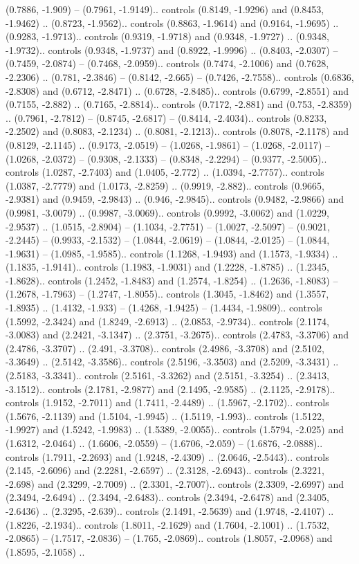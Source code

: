 {(0.7886, -1.909) -- (0.7961, -1.9149).. controls (0.8149, -1.9296) and (0.8453, -1.9462) .. (0.8723, -1.9562).. controls (0.8863, -1.9614) and (0.9164, -1.9695) .. (0.9283, -1.9713).. controls (0.9319, -1.9718) and (0.9348, -1.9727) .. (0.9348, -1.9732).. controls (0.9348, -1.9737) and (0.8922, -1.9996) .. (0.8403, -2.0307) -- (0.7459, -2.0874) -- (0.7468, -2.0959).. controls (0.7474, -2.1006) and (0.7628, -2.2306) .. (0.781, -2.3846) -- (0.8142, -2.665) -- (0.7426, -2.7558).. controls (0.6836, -2.8308) and (0.6712, -2.8471) .. (0.6728, -2.8485).. controls (0.6799, -2.8551) and (0.7155, -2.882) .. (0.7165, -2.8814).. controls (0.7172, -2.881) and (0.753, -2.8359) .. (0.7961, -2.7812) -- (0.8745, -2.6817) -- (0.8414, -2.4034).. controls (0.8233, -2.2502) and (0.8083, -2.1234) .. (0.8081, -2.1213).. controls (0.8078, -2.1178) and (0.8129, -2.1145) .. (0.9173, -2.0519) -- (1.0268, -1.9861) -- (1.0268, -2.0117) -- (1.0268, -2.0372) -- (0.9308, -2.1333) -- (0.8348, -2.2294) -- (0.9377, -2.5005).. controls (1.0287, -2.7403) and (1.0405, -2.772) .. (1.0394, -2.7757).. controls (1.0387, -2.7779) and (1.0173, -2.8259) .. (0.9919, -2.882).. controls (0.9665, -2.9381) and (0.9459, -2.9843) .. (0.946, -2.9845).. controls (0.9482, -2.9866) and (0.9981, -3.0079) .. (0.9987, -3.0069).. controls (0.9992, -3.0062) and (1.0229, -2.9537) .. (1.0515, -2.8904) -- (1.1034, -2.7751) -- (1.0027, -2.5097) -- (0.9021, -2.2445) -- (0.9933, -2.1532) -- (1.0844, -2.0619) -- (1.0844, -2.0125) -- (1.0844, -1.9631) -- (1.0985, -1.9585).. controls (1.1268, -1.9493) and (1.1573, -1.9334) .. (1.1835, -1.9141).. controls (1.1983, -1.9031) and (1.2228, -1.8785) .. (1.2345, -1.8628).. controls (1.2452, -1.8483) and (1.2574, -1.8254) .. (1.2636, -1.8083) -- (1.2678, -1.7963) -- (1.2747, -1.8055).. controls (1.3045, -1.8462) and (1.3557, -1.8935) .. (1.4132, -1.933) -- (1.4268, -1.9425) -- (1.4434, -1.9809).. controls (1.5992, -2.3424) and (1.8249, -2.6913) .. (2.0853, -2.9734).. controls (2.1174, -3.0083) and (2.2421, -3.1347) .. (2.3751, -3.2675).. controls (2.4783, -3.3706) and (2.4786, -3.3707) .. (2.491, -3.3708).. controls (2.4986, -3.3708) and (2.5102, -3.3649) .. (2.5142, -3.3586).. controls (2.5196, -3.3503) and (2.5209, -3.3431) .. (2.5183, -3.3341).. controls (2.5161, -3.3262) and (2.5151, -3.3254) .. (2.3413, -3.1512).. controls (2.1781, -2.9877) and (2.1495, -2.9585) .. (2.1125, -2.9178).. controls (1.9152, -2.7011) and (1.7411, -2.4489) .. (1.5967, -2.1702).. controls (1.5676, -2.1139) and (1.5104, -1.9945) .. (1.5119, -1.993).. controls (1.5122, -1.9927) and (1.5242, -1.9983) .. (1.5389, -2.0055).. controls (1.5794, -2.025) and (1.6312, -2.0464) .. (1.6606, -2.0559) -- (1.6706, -2.059) -- (1.6876, -2.0888).. controls (1.7911, -2.2693) and (1.9248, -2.4309) .. (2.0646, -2.5443).. controls (2.145, -2.6096) and (2.2281, -2.6597) .. (2.3128, -2.6943).. controls (2.3221, -2.698) and (2.3299, -2.7009) .. (2.3301, -2.7007).. controls (2.3309, -2.6997) and (2.3494, -2.6494) .. (2.3494, -2.6483).. controls (2.3494, -2.6478) and (2.3405, -2.6436) .. (2.3295, -2.639).. controls (2.1491, -2.5639) and (1.9748, -2.4107) .. (1.8226, -2.1934).. controls (1.8011, -2.1629) and (1.7604, -2.1001) .. (1.7532, -2.0865) -- (1.7517, -2.0836) -- (1.765, -2.0869).. controls (1.8057, -2.0968) and (1.8595, -2.1058) .. }
